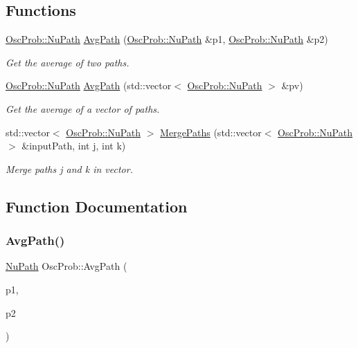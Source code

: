 \subsection*{Functions}
\begin{DoxyCompactItemize}
\item 
\hyperlink{structOscProb_1_1NuPath}{Osc\+Prob\+::\+Nu\+Path} \hyperlink{namespaceOscProb_a999a7944bad8bc72d7ee9f56f81a210e}{Avg\+Path} (\hyperlink{structOscProb_1_1NuPath}{Osc\+Prob\+::\+Nu\+Path} \&p1, \hyperlink{structOscProb_1_1NuPath}{Osc\+Prob\+::\+Nu\+Path} \&p2)
\begin{DoxyCompactList}\small\item\em Get the average of two paths. \end{DoxyCompactList}\item 
\hyperlink{structOscProb_1_1NuPath}{Osc\+Prob\+::\+Nu\+Path} \hyperlink{namespaceOscProb_a68e2c991fb8e0e76833482be455a55ee}{Avg\+Path} (std\+::vector$<$ \hyperlink{structOscProb_1_1NuPath}{Osc\+Prob\+::\+Nu\+Path} $>$ \&pv)
\begin{DoxyCompactList}\small\item\em Get the average of a vector of paths. \end{DoxyCompactList}\item 
std\+::vector$<$ \hyperlink{structOscProb_1_1NuPath}{Osc\+Prob\+::\+Nu\+Path} $>$ \hyperlink{namespaceOscProb_a7c203d8583a34acf2ae90185ba45f866}{Merge\+Paths} (std\+::vector$<$ \hyperlink{structOscProb_1_1NuPath}{Osc\+Prob\+::\+Nu\+Path} $>$ \&input\+Path, int j, int k)
\begin{DoxyCompactList}\small\item\em Merge paths j and k in vector. \end{DoxyCompactList}\end{DoxyCompactItemize}


\subsection{Function Documentation}
\mbox{\label{namespaceOscProb_a999a7944bad8bc72d7ee9f56f81a210e}} 
\subsubsection{\texorpdfstring{Avg\+Path()}{AvgPath()}\hspace{0.1cm}{\footnotesize\ttfamily [1/2]}}
{\footnotesize\ttfamily \hyperlink{structOscProb_1_1NuPath}{Nu\+Path} Osc\+Prob\+::\+Avg\+Path (\begin{DoxyParamCaption}\item[{\hyperlink{structOscProb_1_1NuPath}{Osc\+Prob\+::\+Nu\+Path} \&}]{p1,  }\item[{\hyperlink{structOscProb_1_1NuPath}{Osc\+Prob\+::\+Nu\+Path} \&}]{p2 }\end{DoxyParamCaption})}

